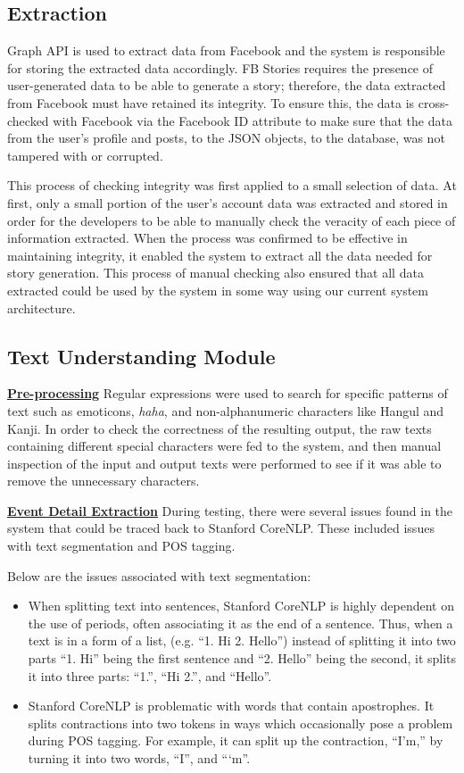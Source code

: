 \subsection{Extraction}
Graph API is used to extract data from Facebook and the system is responsible for storing the extracted data accordingly. FB Stories requires the presence of user-generated data to be able to generate a story; therefore, the data extracted from Facebook must have retained its integrity. To ensure this, the data is cross-checked with Facebook via the Facebook ID attribute to make sure that the data from the user’s profile and posts, to the JSON objects, to the database, was not tampered with or corrupted.

This process of checking integrity was first applied to a small selection of data. At first, only a small portion of the user’s account data was extracted and stored in order for the developers to be able to manually check the veracity of each piece of information extracted. When the process was confirmed to be effective in maintaining integrity, it enabled the system to extract all the data needed for story generation. This process of manual checking also ensured that all data extracted could be used by the system in some way using our current system architecture.

\subsection{Text Understanding Module}
\underline{\textbf{Pre-processing}}
Regular expressions were used to search for specific patterns of text such as emoticons, \textit{haha}, and non-alphanumeric characters like Hangul and Kanji. In order to check the correctness of the resulting output, the raw texts containing different special characters were fed to the system, and then manual inspection of the input and output texts were performed to see if it was able to remove the unnecessary characters. 

\underline{\textbf{Event Detail Extraction}}
During testing, there were several issues found in the system that could be traced back to Stanford CoreNLP. These included issues with text segmentation and POS tagging.

Below are the issues associated with text segmentation:
\begin{itemize}
	\item When splitting text into sentences, Stanford CoreNLP is highly dependent on the use of periods, often associating it as the end of a sentence. Thus, when a text is in a form of a list, (e.g. ``1. Hi 2. Hello”) instead of splitting it into two parts ``1. Hi” being the first sentence and ``2. Hello” being the second, it splits it into three parts: ``1.”, ``Hi 2.”, and ``Hello”. 
	\item Stanford CoreNLP is problematic with words that contain apostrophes. It splits contractions into two tokens in ways which occasionally pose a problem during POS tagging. For example, it can split up the contraction, ``I’m,” by turning it into two words, ``I”, and ``‘m”.
\end{itemize}

